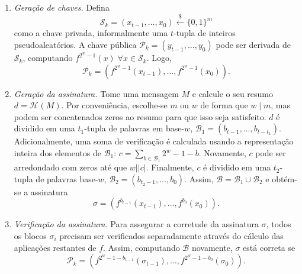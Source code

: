 \documentclass{ufsctex/ufsctex}
\newcommand{\pk}{\mathcal{P}_k}
\newcommand{\sk}{\mathcal{S}_k}
\newcommand{\hash}[2][]{\mathcal{H}^{#1} (#2)}
\newcommand{\binwds}[1]{\{0, 1\}^{#1}}
\newcommand{\length}[1]{\vert{} #1 \vert{}}
\newcommand{\random}{\stackrel{\$}{\longleftarrow}}
\begin{document}
\begin{enumerate}

  \item[] \emph{Geração de chaves.} Defina
      \begin{equation}
        \sk{} = (x_{t-1}, \dots, x_0) \random{} \binwds{m}
      \end{equation}
        como a chave privada, informalmente uma $t$-tupla de inteiros
        pseudoaleatórios. A chave pública $\pk{} = (y_{t-1}, \dots, y_0)$ pode
        ser derivada de $\sk{}$, computando $f^{2^{w}-1}(x) \; \forall x \in
        \sk{}$.
        Logo,
        \begin{equation}
          \pk{} = (f^{2^{w}-1}(x_{t-1}), \dots, f^{2^{w}-1}(x_0)).
        \end{equation}

  \item[] \emph{Geração da assinatura.} Tome uma mensagem $M$ e calcule o seu
      resumo $d = \hash{M}$. Por conveniência, escolhe-se $m$ ou $w$ de forma
        que $w \mid m$, mas podem ser concatenados zeros ao resumo para que
        isso seja satisfeito. $d$ é dividido em uma $t_1$-tupla de palavras em
        base-$w$, $\mathcal{B}_1 = (b_{t-1}, \dots, b_{t-t_1})$.
        Adicionalmente, uma soma de verificação é calculada usando a
        representação inteira dos elementos de $\mathcal{B}_1$: $c = \sum_{b
        \in \mathcal{B}_1} 2^w - 1 - b$. Novamente, $c$ pode ser arredondado
        com zeros até que $w \mid \length{c}$. Finalmente, $c$ é dividido em
        uma $t_2$-tupla de palavras base-$w$, $\mathcal{B}_2 = (b_{t_2-1},
        \dots, b_0)$. Assim, $\mathcal{B} = \mathcal{B}_1 \cup \mathcal{B}_2$ e
        obtém-se a assinatura
        \begin{equation}
          \sigma = (f^{b_{t-1}}(x_{t-1}), \dots, f^{b_0}(x_0)).
        \end{equation}

  \item[] \emph{Verificação da assinatura.} Para assegurar a corretude da
      assinatura $\sigma$, todos os blocos $\sigma_i$ precisam ser verificados
        separadamente através do cálculo das aplicações restantes de $f$.
        Assim, computando $\mathcal{B}$ novamente, $\sigma$ está correta se
        \begin{equation}
          \pk{} = (f^{2^w - 1 - b_{t-1}}(\sigma_{t-1}),
            \dots, f^{2^w - 1 - b_0}(\sigma_0)).
        \end{equation}

\end{enumerate}
\end{document}
